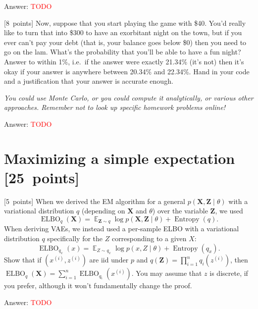 \documentclass{article}
\newcommand{\ask}[1]{\textcolor{question}{#1}}
\newenvironment{answer}{\par\begingroup\color{answer}Answer: }{\endgroup}
\newcommand{\red}[1]{\textcolor{red}{#1}}
\newcommand{\pts}[1]{\textcolor{points}{[#1~points]}}
\newcommand{\meta}[1]{\textcolor{black!60!white}{\emph{#1}}}
\newcommand{\TODO}{\red{TODO}}
\DeclareMathOperator{\E}{\mathbb{E}}
\DeclareMathOperator{\ELBO}{ELBO}
\DeclareMathOperator{\Entropy}{Entropy}
\newcommand{\bX}{\mathbf{X}}
\newcommand{\bZ}{\mathbf{Z}}
\newcommand{\toth}[1]{^{(#1)}}
\newcommand{\ith}{\toth{i}}
\numberwithin{equation}{section}
\begin{document}
\begin{qlist}
\begin{answer}\TODO\end{answer}


\item \pts{8}
    Now, suppose that you start playing the game with \$40.
    You'd really like to turn that into \$300 to have an exorbitant night on the town,
    but if you ever can't pay your debt (that is, your balance goes below \$0)
    then you need to go on the lam.
    What's the probability that you'll be able to have a fun night?
    \ask{Answer to within 1\%}, i.e.\ if the answer were exactly 21.34\% (it's not)
    then it's okay if your answer is anywhere between 20.34\% and 22.34\%.
    \ask{Hand in your code and a justification that your answer is accurate enough.}

    \meta{You could use Monte Carlo, or you could compute it analytically, or various other approaches. Remember not to look up specific homework problems online!}

\begin{answer}\TODO\end{answer}



\end{qlist}




\clearpage
\section{Maximizing a simple expectation \pts{25}}
\begin{qlist}
\item \pts{5} When we derived the EM algorithm for a general $p(\bX, \bZ \mid \theta)$ with a variational distribution $q$ (depending on $\bX$ and $\theta$) over the variable $\bZ$,
  we used
\[
    \ELBO_{q}(\bX) = \E_{\bZ \sim q} \log p(\bX, \bZ \mid \theta) + \Entropy(q)
.\]
  When deriving VAEs, we instead used a per-sample ELBO with a variational distribution $q$ specifically for the $Z$ corresponding to a given $X$:
\[
    \ELBO_{q_x}(x) = \E_{Z \sim q_x} \log p(x, Z \mid \theta) + \Entropy(q_x)
.\]
  \ask{Show that if $(x\ith, z\ith)$ are iid under $p$ and $q(\bZ) = \prod_{i=1}^n q_i(z\ith)$,
  then $\ELBO_q(\bX) = \sum_{i=1}^n \ELBO_{q_{i}}(x\ith)$.}
  You may assume that $z$ is discrete, if you prefer,
  although it won't fundamentally change the proof.
  \begin{answer}\TODO\end{answer}
\end{qlist}
\end{document}
